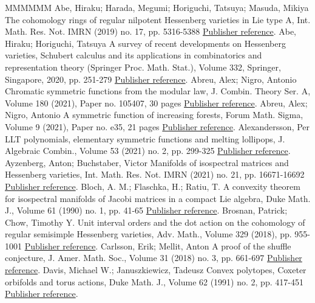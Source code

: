 \begin{thebibliography}{MMMMMM}
 Abe, Hiraku; Harada, Megumi; Horiguchi, Tatsuya; Masuda, Mikiya The cohomology rings of regular nilpotent Hessenberg varieties in Lie type A, Int. Math. Res. Not. IMRN (2019) no. 17, pp. 5316-5388 \href{https://alco.centre-mersenne.org/articles/10.5802/alco.349/#AHHM}{Publisher reference}.
 Abe, Hiraku; Horiguchi, Tatsuya A survey of recent developments on Hessenberg varieties, Schubert calculus and its applications in combinatorics and representation theory (Springer Proc. Math. Stat.), Volume 332, Springer, Singapore, 2020, pp. 251-279 \href{https://alco.centre-mersenne.org/articles/10.5802/alco.349/#AH}{Publisher reference}.
 Abreu, Alex; Nigro, Antonio Chromatic symmetric functions from the modular law, J. Combin. Theory Ser. A, Volume 180 (2021), Paper no. 105407, 30 pages \href{https://alco.centre-mersenne.org/articles/10.5802/alco.349/#AN}{Publisher reference}.
 Abreu, Alex; Nigro, Antonio A symmetric function of increasing forests, Forum Math. Sigma, Volume 9 (2021), Paper no. e35, 21 pages \href{https://alco.centre-mersenne.org/articles/10.5802/alco.349/#AN2}{Publisher reference}.
 Alexandersson, Per LLT polynomials, elementary symmetric functions and melting lollipops, J. Algebraic Combin., Volume 53 (2021) no. 2, pp. 299-325 \href{https://alco.centre-mersenne.org/articles/10.5802/alco.349/#Ale}{Publisher reference}.
 Ayzenberg, Anton; Buchstaber, Victor Manifolds of isospectral matrices and Hessenberg varieties, Int. Math. Res. Not. IMRN (2021) no. 21, pp. 16671-16692 \href{https://alco.centre-mersenne.org/articles/10.5802/alco.349/#AB}{Publisher reference}.
 Bloch, A. M.; Flaschka, H.; Ratiu, T. A convexity theorem for isospectral manifolds of Jacobi matrices in a compact Lie algebra, Duke Math. J., Volume 61 (1990) no. 1, pp. 41-65 \href{https://alco.centre-mersenne.org/articles/10.5802/alco.349/#BFR}{Publisher reference}.
 Brosnan, Patrick; Chow, Timothy Y. Unit interval orders and the dot action on the cohomology of regular semisimple Hessenberg varieties, Adv. Math., Volume 329 (2018), pp. 955-1001 \href{https://alco.centre-mersenne.org/articles/10.5802/alco.349/#BC}{Publisher reference}.
 Carlsson, Erik; Mellit, Anton A proof of the shuffle conjecture, J. Amer. Math. Soc., Volume 31 (2018) no. 3, pp. 661-697 \href{https://alco.centre-mersenne.org/articles/10.5802/alco.349/#CM}{Publisher reference}.
 Davis, Michael W.; Januszkiewicz, Tadeusz Convex polytopes, Coxeter orbifolds and torus actions, Duke Math. J., Volume 62 (1991) no. 2, pp. 417-451 \href{https://alco.centre-mersenne.org/articles/10.5802/alco.349/#DJ}{Publisher reference}.

\end{thebibliography}
